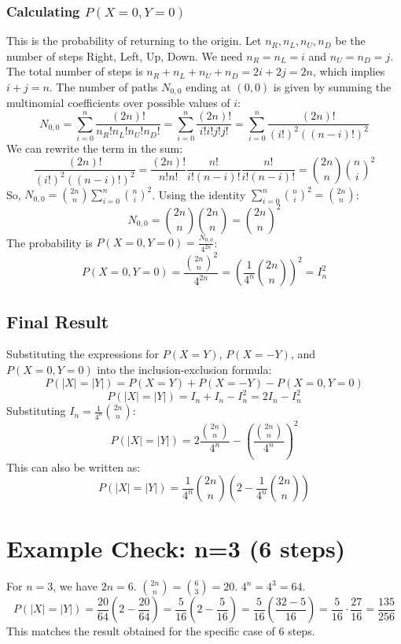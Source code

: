 \documentclass{article}
\begin{document}
\subsubsection{Calculating $P(X=0, Y=0)$}
This is the probability of returning to the origin. Let $n_R, n_L, n_U, n_D$ be the number of steps Right, Left, Up, Down. We need $n_R = n_L = i$ and $n_U = n_D = j$. The total number of steps is $n_R+n_L+n_U+n_D = 2i + 2j = 2n$, which implies $i+j=n$.
The number of paths $N_{0,0}$ ending at $(0,0)$ is given by summing the multinomial coefficients over possible values of $i$:
\[
N_{0,0} = \sum_{i=0}^{n} \frac{(2n)!}{n_R! n_L! n_U! n_D!} = \sum_{i=0}^{n} \frac{(2n)!}{i! i! j! j!} = \sum_{i=0}^{n} \frac{(2n)!}{(i!)^2 ((n-i)!)^2}
\]
We can rewrite the term in the sum:
\[
\frac{(2n)!}{(i!)^2 ((n-i)!)^2} = \frac{(2n)!}{n!n!} \frac{n!}{i!(n-i)!} \frac{n!}{i!(n-i)!} = \binom{2n}{n} \binom{n}{i}^2
\]
So, $N_{0,0} = \binom{2n}{n} \sum_{i=0}^{n} \binom{n}{i}^2$. Using the identity $\sum_{i=0}^{n} \binom{n}{i}^2 = \binom{2n}{n}$:
\[
N_{0,0} = \binom{2n}{n} \binom{2n}{n} = \binom{2n}{n}^2
\]
The probability is $P(X=0, Y=0) = \frac{N_{0,0}}{4^{2n}}$:
\[
P(X=0, Y=0) = \frac{\binom{2n}{n}^2}{4^{2n}} = \left( \frac{1}{4^n} \binom{2n}{n} \right)^2 = I_n^2
\]

\subsection{Final Result}
Substituting the expressions for $P(X=Y)$, $P(X=-Y)$, and $P(X=0, Y=0)$ into the inclusion-exclusion formula:
\[
P(|X|=|Y|) = P(X=Y) + P(X=-Y) - P(X=0, Y=0)
\]
\[
P(|X|=|Y|) = I_n + I_n - I_n^2 = 2I_n - I_n^2
\]
Substituting $I_n = \frac{1}{4^n} \binom{2n}{n}$:
\[
P(|X|=|Y|) = 2 \frac{\binom{2n}{n}}{4^n} - \left( \frac{\binom{2n}{n}}{4^n} \right)^2
\]
This can also be written as:
\[
P(|X|=|Y|) = \frac{1}{4^n} \binom{2n}{n} \left( 2 - \frac{1}{4^n} \binom{2n}{n} \right)
\]

\section*{Example Check: n=3 (6 steps)}
For $n=3$, we have $2n=6$. $\binom{2n}{n} = \binom{6}{3} = 20$. $4^n = 4^3 = 64$.
\[
P(|X|=|Y|) = \frac{20}{64} \left( 2 - \frac{20}{64} \right) = \frac{5}{16} \left( 2 - \frac{5}{16} \right) = \frac{5}{16} \left( \frac{32-5}{16} \right) = \frac{5}{16} \cdot \frac{27}{16} = \frac{135}{256}
\]
This matches the result obtained for the specific case of 6 steps.
\end{document}

